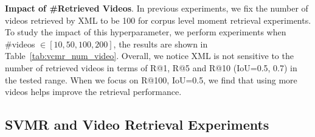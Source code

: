 \documentclass[runningheads]{llncs}
\newcommand{\ra}[1]{\renewcommand{\arraystretch}{#1}}
\begin{document}
\begin{table*}[!t]
\setlength{\tabcolsep}{0.3em}
\ra{1.}
\centering
\small
\caption{Impact of \#retrieved videos on TVR \textit{val} set, VCMR task.}
\label{tab:vcmr_num_video}
\end{table*}




\kern2mm
\noindent\textbf{Impact of \#Retrieved Videos}. In previous experiments, we fix the number of videos retrieved by XML to be 100 for corpus level moment retrieval experiments. To study the impact of this hyperparameter, we perform experiments when \#videos $\in [10, 50, 100, 200]$, the results are shown in Table~\ref{tab:vcmr_num_video}. Overall, we notice XML is not sensitive to the number of retrieved videos in terms of R@1, R@5 and R@10 (IoU=0.5, 0.7) in the tested range. When we focus on R@100, IoU=0.5, we find that using more videos helps improve the retrieval performance.


\subsection{SVMR and Video Retrieval Experiments}
\end{document}
